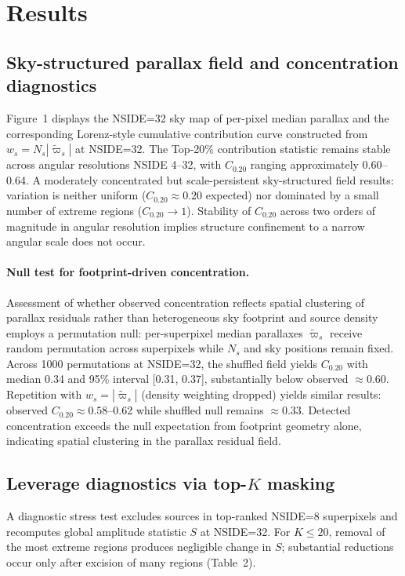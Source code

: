 \section{Results}

\subsection{Sky-structured parallax field and concentration diagnostics}
Figure~1 displays the NSIDE=32 sky map of per-pixel median parallax and the corresponding Lorenz-style cumulative contribution curve constructed from $w_s = N_s |\tilde{\varpi}_s|$ at NSIDE=32. The Top-20\% contribution statistic remains stable across angular resolutions NSIDE 4--32, with $C_{0.20}$ ranging approximately 0.60--0.64. A moderately concentrated but scale-persistent sky-structured field results: variation is neither uniform ($C_{0.20} \approx 0.20$ expected) nor dominated by a small number of extreme regions ($C_{0.20} \rightarrow 1$). Stability of $C_{0.20}$ across two orders of magnitude in angular resolution implies structure confinement to a narrow angular scale does not occur.

\paragraph{Null test for footprint-driven concentration.}
Assessment of whether observed concentration reflects spatial clustering of parallax residuals rather than heterogeneous sky footprint and source density employs a permutation null: per-superpixel median parallaxes $\tilde{\varpi}_s$ receive random permutation across superpixels while $N_s$ and sky positions remain fixed. Across 1000 permutations at NSIDE=32, the shuffled field yields $C_{0.20}$ with median 0.34 and 95\% interval [0.31, 0.37], substantially below observed $\approx 0.60$. Repetition with $w_s = |\tilde{\varpi}_s|$ (density weighting dropped) yields similar results: observed $C_{0.20} \approx 0.58$--0.62 while shuffled null remains $\approx 0.33$. Detected concentration exceeds the null expectation from footprint geometry alone, indicating spatial clustering in the parallax residual field.

\subsection{Leverage diagnostics via top-\texorpdfstring{$K$}{K} masking}
A diagnostic stress test excludes sources in top-ranked NSIDE=8 superpixels and recomputes global amplitude statistic $S$ at NSIDE=32. For $K \le 20$, removal of the most extreme regions produces negligible change in $S$; substantial reductions occur only after excision of many regions (Table~2).

